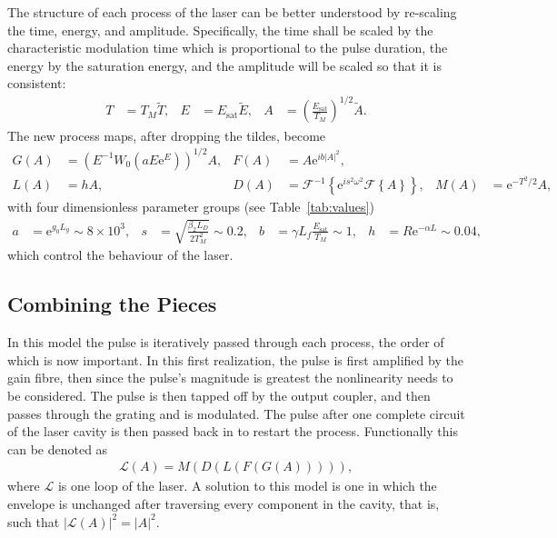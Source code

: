 \documentclass[12pt]{article}
\newcommand{\Es}{E_{\textrm{sat}}}
\newcommand{\FT}[1]{\mathcal{F}\left\{ #1 \right\}}
\newcommand{\FTi}[1]{\mathcal{F}^{-1}\left\{ #1 \right\}}
\begin{document}
The structure of each process of the laser can be better understood by re-scaling the time, energy, and amplitude. Specifically, the time shall be scaled by the characteristic modulation time which is proportional to the pulse duration, the energy by the saturation energy, and the amplitude will be scaled so that it is consistent:
\begin{align*}
	T &= T_M \widetilde{T},& E &= \Es \widetilde{E},& A &= \left( \frac{\Es}{T_M} \right)^{1/2} \widetilde{A}.
\end{align*}
The new process maps, after dropping the tildes, become
\begin{align*}
	G(A) &= \left(E^{-1} W_0 \left( a E \textrm{e}^{E}\right) \right)^{1/2} A,&
	F(A) &= A \textrm{e}^{i b |A|^2}, \\
	L(A) &= h A,&
	D(A) &= \FTi{\textrm{e}^{i s^2 \omega^2} \FT{A}},&
	M(A) &= \textrm{e}^{-T^2 / 2} A,
\end{align*}
with four dimensionless parameter groups (see Table~\ref{tab:values})
\begin{align*}
	a &= \textrm{e}^{g_0 L_g} \sim 8 \times 10^3,& s &= \sqrt{\frac{\beta_2 L_D}{2 T_M^2}} \sim 0.2,&
	b &= \gamma L_f \frac{\Es}{T_M} \sim 1,& h &= R \textrm{e}^{-\alpha L} \sim 0.04,
\end{align*}
which control the behaviour of the laser.

\subsection{Combining the Pieces}
In this model the pulse is iteratively passed through each process, the order of which is now important. In this first realization, the pulse is first amplified by the gain fibre, then since the pulse's magnitude is greatest the nonlinearity needs to be considered. The pulse is then tapped off by the output coupler, and then passes through the grating and is modulated. The pulse after one complete circuit of the laser cavity is then passed back in to restart the process. Functionally this can be denoted as
\begin{align*}
	\mathcal{L}(A) = M(D(L(F(G(A))))),
\end{align*}
where $\mathcal{L}$ is one loop of the laser. A solution to this model is one in which the envelope is unchanged after traversing every component in the cavity, that is, such that $|\mathcal{L}(A)|^2 = |A|^2$.
\end{document}
